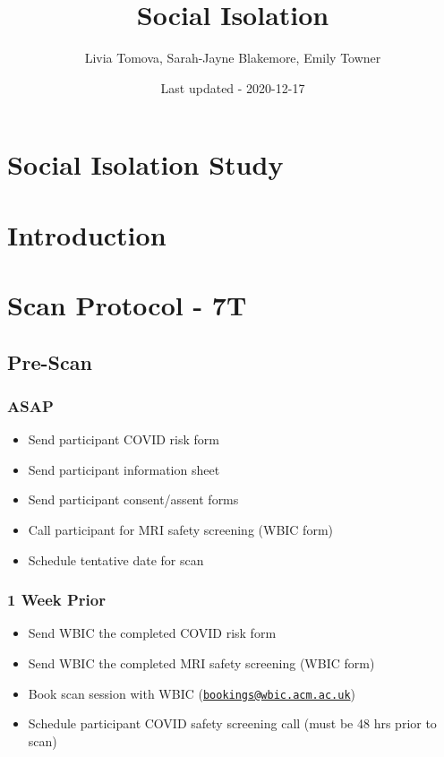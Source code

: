 \documentclass[
]{book}
\title{Social Isolation}
\author{Livia Tomova, Sarah-Jayne Blakemore, Emily Towner}
\date{Last updated - 2020-12-17}
\providecommand{\tightlist}{%
  \setlength{\itemsep}{0pt}\setlength{\parskip}{0pt}}
\begin{document}
\maketitle

{
\setcounter{tocdepth}{1}
\tableofcontents
}
\hypertarget{social-isolation-study}{%
\chapter{Social Isolation Study}\label{social-isolation-study}}

\hypertarget{intro}{%
\chapter{Introduction}\label{intro}}

\hypertarget{scan-protocol}{%
\chapter{Scan Protocol - 7T}\label{scan-protocol}}

\hypertarget{pre-scan}{%
\section{Pre-Scan}\label{pre-scan}}

\hypertarget{asap}{%
\subsection{ASAP}\label{asap}}

\begin{itemize}
\tightlist
\item
  Send participant COVID risk form
\item
  Send participant information sheet
\item
  Send participant consent/assent forms
\item
  Call participant for MRI safety screening (WBIC form)
\item
  Schedule tentative date for scan
\end{itemize}

\hypertarget{week-prior}{%
\subsection{1 Week Prior}\label{week-prior}}

\begin{itemize}
\tightlist
\item
  Send WBIC the completed COVID risk form
\item
  Send WBIC the completed MRI safety screening (WBIC form)
\item
  Book scan session with WBIC (\href{mailto:bookings@wbic.acm.ac.uk}{\nolinkurl{bookings@wbic.acm.ac.uk}})
\item
  Schedule participant COVID safety screening call (must be 48 hrs prior to scan)
\end{itemize}
\end{document}
